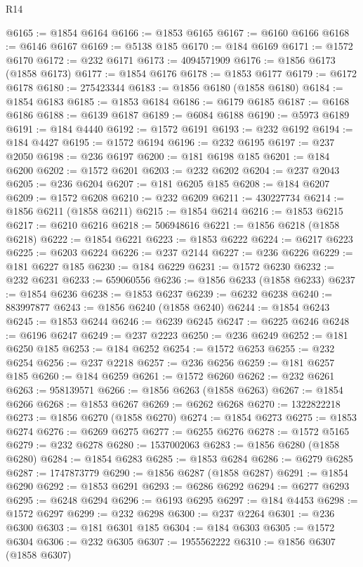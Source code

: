 \begin{lexlean}{R14}
\begin{coremodule}
@6165 := @1854 @6164
@6166 := @1853 @6165
@6167 := @6160 @6166
@6168 := @6146 @6167
@6169 := @5138 @185
@6170 := @184 @6169
@6171 := @1572 @6170
@6172 := @232 @6171
@6173 := 4094571909
@6176 := @1856 @6173 (@1858 @6173)
@6177 := @1854 @6176
@6178 := @1853 @6177
@6179 := @6172 @6178
@6180 := 275423344
@6183 := @1856 @6180 (@1858 @6180)
@6184 := @1854 @6183
@6185 := @1853 @6184
@6186 := @6179 @6185
@6187 := @6168 @6186
@6188 := @6139 @6187
@6189 := @6084 @6188
@6190 := @5973 @6189
@6191 := @184 @4440
@6192 := @1572 @6191
@6193 := @232 @6192
@6194 := @184 @4427
@6195 := @1572 @6194
@6196 := @232 @6195
@6197 := @237 @2050
@6198 := @236 @6197
@6200 := @181 @6198 @185
@6201 := @184 @6200
@6202 := @1572 @6201
@6203 := @232 @6202
@6204 := @237 @2043
@6205 := @236 @6204
@6207 := @181 @6205 @185
@6208 := @184 @6207
@6209 := @1572 @6208
@6210 := @232 @6209
@6211 := 430227734
@6214 := @1856 @6211 (@1858 @6211)
@6215 := @1854 @6214
@6216 := @1853 @6215
@6217 := @6210 @6216
@6218 := 506948616
@6221 := @1856 @6218 (@1858 @6218)
@6222 := @1854 @6221
@6223 := @1853 @6222
@6224 := @6217 @6223
@6225 := @6203 @6224
@6226 := @237 @2144
@6227 := @236 @6226
@6229 := @181 @6227 @185
@6230 := @184 @6229
@6231 := @1572 @6230
@6232 := @232 @6231
@6233 := 659060556
@6236 := @1856 @6233 (@1858 @6233)
@6237 := @1854 @6236
@6238 := @1853 @6237
@6239 := @6232 @6238
@6240 := 883997877
@6243 := @1856 @6240 (@1858 @6240)
@6244 := @1854 @6243
@6245 := @1853 @6244
@6246 := @6239 @6245
@6247 := @6225 @6246
@6248 := @6196 @6247
@6249 := @237 @2223
@6250 := @236 @6249
@6252 := @181 @6250 @185
@6253 := @184 @6252
@6254 := @1572 @6253
@6255 := @232 @6254
@6256 := @237 @2218
@6257 := @236 @6256
@6259 := @181 @6257 @185
@6260 := @184 @6259
@6261 := @1572 @6260
@6262 := @232 @6261
@6263 := 958139571
@6266 := @1856 @6263 (@1858 @6263)
@6267 := @1854 @6266
@6268 := @1853 @6267
@6269 := @6262 @6268
@6270 := 1322822218
@6273 := @1856 @6270 (@1858 @6270)
@6274 := @1854 @6273
@6275 := @1853 @6274
@6276 := @6269 @6275
@6277 := @6255 @6276
@6278 := @1572 @5165
@6279 := @232 @6278
@6280 := 1537002063
@6283 := @1856 @6280 (@1858 @6280)
@6284 := @1854 @6283
@6285 := @1853 @6284
@6286 := @6279 @6285
@6287 := 1747873779
@6290 := @1856 @6287 (@1858 @6287)
@6291 := @1854 @6290
@6292 := @1853 @6291
@6293 := @6286 @6292
@6294 := @6277 @6293
@6295 := @6248 @6294
@6296 := @6193 @6295
@6297 := @184 @4453
@6298 := @1572 @6297
@6299 := @232 @6298
@6300 := @237 @2264
@6301 := @236 @6300
@6303 := @181 @6301 @185
@6304 := @184 @6303
@6305 := @1572 @6304
@6306 := @232 @6305
@6307 := 1955562222
@6310 := @1856 @6307 (@1858 @6307)

\end{coremodule}
\end{lexlean}
